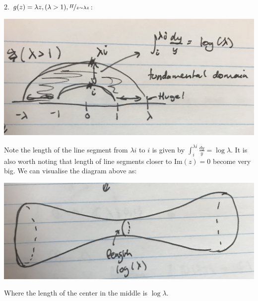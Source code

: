 \documentclass[a4paper, 11pt]{book}
\theoremstyle{definition}
\theoremstyle{remark}
\begin{document}
    2. $g(z) = \lambda z, (\lambda > 1), \nicefrac{H}{z\sim\lambda z}$:
    \begin{center}
        \includegraphics[scale=0.05]{IMG_1019}
    \end{center}
    Note the length of the line segment from $\lambda i$ to $i$ is given by $\int_i^{\lambda i} \frac{dy}{y} = \log{\lambda}$. It
    is also worth noting that length of line segments closer to Im$(z)= 0$ become very big. We can visualise the diagram above as:
    \begin{center}
        \includegraphics[scale=0.05]{IMG_1020}
    \end{center}
    Where the length of the center in the middle is $\log{\lambda}$.\\
\end{document}
